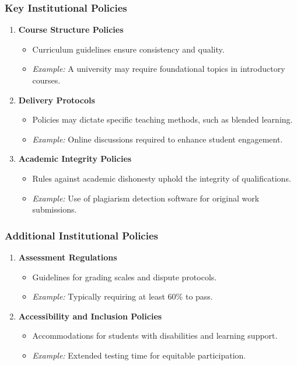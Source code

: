 \documentclass[aspectratio=169]{beamer}
\begin{document}
\begin{frame}[fragile]
    \frametitle{Key Institutional Policies}
    \begin{enumerate}
        \item \textbf{Course Structure Policies} 
        \begin{itemize}
            \item Curriculum guidelines ensure consistency and quality.
            \item \textit{Example:} A university may require foundational topics in introductory courses.
        \end{itemize}
        
        \item \textbf{Delivery Protocols}
        \begin{itemize}
            \item Policies may dictate specific teaching methods, such as blended learning.
            \item \textit{Example:} Online discussions required to enhance student engagement.
        \end{itemize}
        
        \item \textbf{Academic Integrity Policies}
        \begin{itemize}
            \item Rules against academic dishonesty uphold the integrity of qualifications.
            \item \textit{Example:} Use of plagiarism detection software for original work submissions.
        \end{itemize}
    \end{enumerate}
\end{frame}

\begin{frame}[fragile]
    \frametitle{Additional Institutional Policies}
    \begin{enumerate}[resume]
        \item \textbf{Assessment Regulations}
        \begin{itemize}
            \item Guidelines for grading scales and dispute protocols.
            \item \textit{Example:} Typically requiring at least 60\% to pass.
        \end{itemize}
        
        \item \textbf{Accessibility and Inclusion Policies}
        \begin{itemize}
            \item Accommodations for students with disabilities and learning support.
            \item \textit{Example:} Extended testing time for equitable participation.
        \end{itemize}
    \end{enumerate}
\end{frame}
\end{document}
